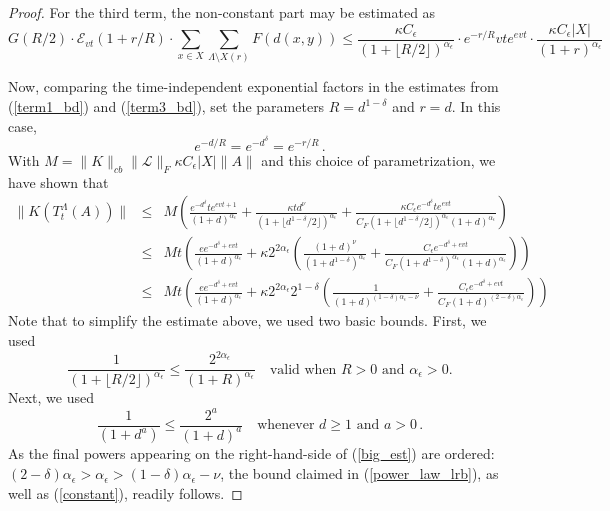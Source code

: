 \documentclass{article}
\newcommand{\E}{\mathscr{E}}
\newcommand{\<}{\langle}
\renewcommand{\>}{\rangle}
\numberwithin{equation}{section}
\theoremstyle{definition}
\begin{document}
\begin{proof}
For the third term, the non-constant part may be estimated as
\begin{equation} \label{term3_bd}
G(R/2) \cdot \E_{vt}(1+r/R) \cdot \sum_{x \in X} \sum_{\Lambda \setminus X(r)} F(d(x,y)) \leq \frac{\kappa C_{\epsilon}}{(1+ \lfloor R/2 \rfloor)^{\alpha_\epsilon}} \cdot
e^{- r/R} v t e^{evt} \cdot \frac{ \kappa C_{\epsilon} |X|}{(1+r)^{\alpha_\epsilon}}
\end{equation}

Now, comparing the time-independent exponential factors in the estimates from (\ref{term1_bd}) and (\ref{term3_bd}), set the 
parameters $R = d^{1- \delta}$ and $r = d$.  
In this case,
\begin{equation}
e^{- d/R} = e^{-d^{\delta}} = e^{-r/R}\, .
\end{equation}
With $M = \| K \|_{cb}\| \mathscr{L} \|_F \kappa C_{\epsilon}  |X| \| A \|$ and this choice of parametrization, we have shown that
\begin{eqnarray} \label{big_est}
\| K(T_t^{\Lambda}(A)) \| & \leq & M \left( \frac{e^{- d^{\delta}} t e^{evt+1}}{(1+d)^{\alpha_{\epsilon}}} 
+  \frac{\kappa t d^{\nu}}{(1+ \lfloor d^{1- \delta}/2 \rfloor)^{\alpha_\epsilon}} + \frac{\kappa C_{\epsilon} e^{- d^{\delta}} t e^{evt}}{ C_F(1+ \lfloor d^{1- \delta}/2 \rfloor)^{\alpha_{\epsilon}} (1+d)^{\alpha_{\epsilon}}}  \right) \nonumber \\
& \leq & M t \left( \frac{e e^{- d^{\delta} +evt}}{(1+d)^{\alpha_{\epsilon}}} 
+ \kappa 2^{2 \alpha_{\epsilon}} \left( \frac{(1+d)^{\nu}}{(1+ d^{1- \delta})^{\alpha_\epsilon}} + \frac{C_{\epsilon} e^{- d^{\delta} +evt}}{ C_F (1+  d^{1- \delta})^{\alpha_{\epsilon}} (1+d)^{\alpha_{\epsilon}}} \right) \right) \nonumber \\
& \leq & M t \left( \frac{e e^{- d^{\delta} +evt }}{(1+d)^{\alpha_{\epsilon}}} 
+ \kappa 2^{2 \alpha_{\epsilon}} 2^{1- \delta} \left( \frac{1 }{(1+ d)^{(1- \delta)\alpha_\epsilon - \nu}} + \frac{C_{\epsilon} e^{- d^{\delta} +evt}}{ C_F(1+d)^{(2-\delta) \alpha_{\epsilon}}} \right) \right)
\end{eqnarray}
Note that to simplify the estimate above, we used two basic bounds. First, we used
\begin{equation}
\frac{1}{(1+ \lfloor R/2 \rfloor)^{\alpha_{\epsilon}}} \leq \frac{2^{2 \alpha_{\epsilon}}}{(1+R)^{\alpha_{\epsilon}}} \quad \mbox{valid when } R>0 \mbox{ and } \alpha_{\epsilon} >0. 
\end{equation}
Next, we used
\begin{equation}
\frac{1}{(1+d^{a})} \leq \frac{2^{a}}{(1+d)^{a}} \quad \mbox{whenever } d \geq 1 \mbox{ and } a >0 \, .
\end{equation}
As the final powers appearing on the right-hand-side of (\ref{big_est}) are ordered: $(2 - \delta) \alpha_{\epsilon} > \alpha_{\epsilon} > (1- \delta) \alpha_{\epsilon} - \nu$, the bound
claimed in (\ref{power_law_lrb}), as well as (\ref{constant}), readily follows. 
\end{proof}
\end{document}

